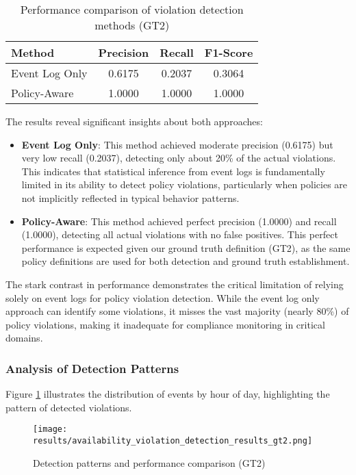 \begin{table}[h]
\centering
\caption{Performance comparison of violation detection methods (GT2)}
\label{tab:detection-performance}
\begin{tabular}{lccc}
\hline
\textbf{Method} & \textbf{Precision} & \textbf{Recall} & \textbf{F1-Score} \\
\hline
Event Log Only & 0.6175 & 0.2037 & 0.3064 \\
Policy-Aware & 1.0000 & 1.0000 & 1.0000 \\
\hline
\end{tabular}
\end{table}

The results reveal significant insights about both approaches:

\begin{itemize}
    \item \textbf{Event Log Only}: This method achieved moderate precision (0.6175) but very low recall (0.2037), detecting only about 20\% of the actual violations. This indicates that statistical inference from event logs is fundamentally limited in its ability to detect policy violations, particularly when policies are not implicitly reflected in typical behavior patterns.
    
    \item \textbf{Policy-Aware}: This method achieved perfect precision (1.0000) and recall (1.0000), detecting all actual violations with no false positives. This perfect performance is expected given our ground truth definition (GT2), as the same policy definitions are used for both detection and ground truth establishment.
\end{itemize}

The stark contrast in performance demonstrates the critical limitation of relying solely on event logs for policy violation detection. While the event log only approach can identify some violations, it misses the vast majority (nearly 80\%) of policy violations, making it inadequate for compliance monitoring in critical domains.

\subsubsection{Analysis of Detection Patterns}

Figure \ref{fig:detection-patterns} illustrates the distribution of events by hour of day, highlighting the pattern of detected violations.

\begin{figure}[h]
\centering
\texttt{[image: results/availability\_violation\_detection\_results\_gt2.png]}
\caption{Detection patterns and performance comparison (GT2)}
\label{fig:detection-patterns}
\end{figure}

